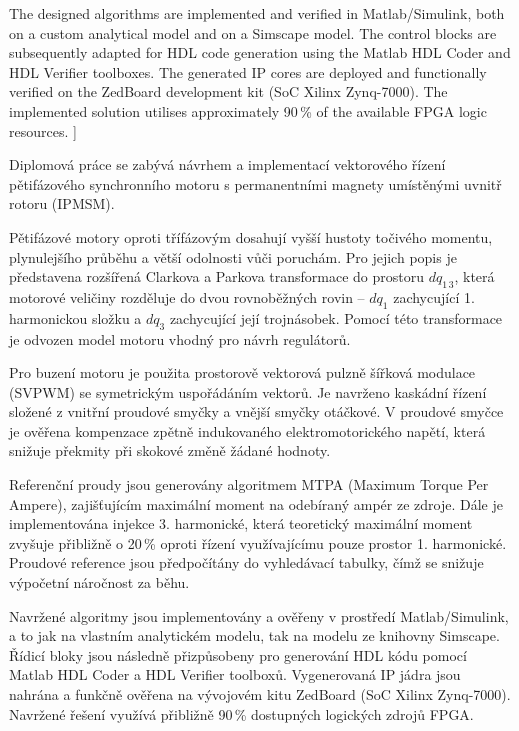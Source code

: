 The designed algorithms are implemented and verified in Matlab/Simulink, both on a custom analytical model and on a Simscape model. The control blocks are subsequently adapted for HDL code generation using the Matlab HDL Coder and HDL Verifier toolboxes. The generated IP cores are deployed and functionally verified on the ZedBoard development kit (SoC Xilinx Zynq-7000). The implemented solution utilises approximately 90\,\% of the available FPGA logic resources.
]{%
Diplomová práce se zabývá návrhem a implementací vektorového řízení pětifázového
synchronního motoru s permanentními magnety umístěnými uvnitř rotoru (IPMSM).

Pětifázové motory oproti třífázovým dosahují vyšší hustoty točivého momentu,
plynulejšího průběhu a větší odolnosti vůči poruchám. Pro jejich popis je
představena rozšířená Clarkova a Parkova transformace do prostoru $dq_{1\,3}$,
která motorové veličiny rozděluje do dvou rovnoběžných rovin -- $dq_1$ zachycující
1. harmonickou složku a $dq_3$ zachycující její trojnásobek. Pomocí této
transformace je odvozen model motoru vhodný pro návrh regulátorů.

Pro buzení motoru je použita prostorově vektorová pulzně šířková modulace (SVPWM)
se symetrickým uspořádáním vektorů. Je navrženo kaskádní řízení složené
z vnitřní proudové smyčky a vnější smyčky otáčkové. V proudové smyčce je ověřena
kompenzace zpětně indukovaného elektromotorického napětí, která snižuje překmity
při skokové změně žádané hodnoty.

Referenční proudy jsou generovány algoritmem MTPA (Maximum Torque Per Ampere),
zajišťujícím maximální moment na odebíraný ampér ze zdroje. Dále je implementována
injekce 3. harmonické, která teoretický maximální moment zvyšuje přibližně
o 20\,\% oproti řízení využívajícímu pouze prostor 1. harmonické. Proudové
reference jsou předpočítány do vyhledávací tabulky, čímž se snižuje výpočetní
náročnost za běhu.

Navržené algoritmy jsou implementovány a ověřeny v prostředí Matlab/Simulink,
a to jak na vlastním analytickém modelu, tak na modelu ze knihovny Simscape.
Řídicí bloky jsou následně přizpůsobeny pro generování HDL kódu pomocí Matlab
HDL Coder a HDL Verifier toolboxů. Vygenerovaná IP jádra jsou nahrána
a funkčně ověřena na vývojovém kitu ZedBoard (SoC Xilinx Zynq-7000).
Navržené řešení využívá přibližně 90\,\% dostupných logických zdrojů FPGA.

  }


%
